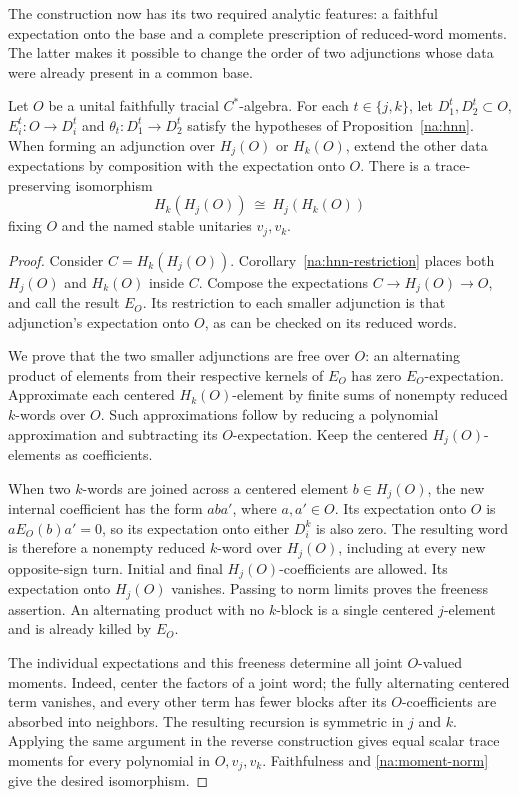 The construction now has its two required analytic features: a
faithful expectation onto the base and a complete prescription of
reduced-word moments.  The latter makes it possible to change the
order of two adjunctions whose data were already present in a common
base.

\begin{proposition}\label{na:reorder}
Let $O$ be a unital faithfully tracial $C^*$-algebra.  For each
$t\in\{j,k\}$, let $D_1^t,D_2^t\subset O$, $E_i^t:O\to D_i^t$
and $\theta_t:D_1^t\to D_2^t$ satisfy the hypotheses of
Proposition~\ref{na:hnn}.  When forming an adjunction over $H_j(O)$
or $H_k(O)$, extend the other data expectations by composition with
the expectation onto $O$.  There is a trace-preserving isomorphism
\begin{equation}\label{na:reorder-equation}
 H_k(H_j(O))\ \cong\ H_j(H_k(O))
\end{equation}
fixing $O$ and the named stable unitaries $v_j,v_k$.
\end{proposition}

\begin{proof}
Consider $C=H_k(H_j(O))$.  Corollary~\ref{na:hnn-restriction} places
both $H_j(O)$ and $H_k(O)$ inside $C$.  Compose the expectations
$C\to H_j(O)\to O$, and call the result $E_O$.  Its restriction to
each smaller adjunction is that adjunction's expectation onto $O$,
as can be checked on its reduced words.

We prove that the two smaller adjunctions are free over $O$: an
alternating product of elements from their respective kernels of
$E_O$ has zero $E_O$-expectation.  Approximate each centered
$H_k(O)$-element by finite sums of nonempty reduced $k$-words over
$O$.  Such approximations follow by reducing a polynomial
approximation and subtracting its $O$-expectation.  Keep the centered
$H_j(O)$-elements as coefficients.

When two $k$-words are joined across a centered element
$b\in H_j(O)$, the new internal coefficient has the form $aba'$,
where $a,a'\in O$.  Its expectation onto $O$ is
$aE_O(b)a'=0$, so its expectation onto either $D_i^k$ is also zero.
The resulting word is therefore a nonempty reduced $k$-word over
$H_j(O)$, including at every new opposite-sign turn.  Initial and
final $H_j(O)$-coefficients are allowed.  Its expectation onto
$H_j(O)$ vanishes.  Passing to norm limits proves the freeness
assertion.  An alternating product with no $k$-block is a single
centered $j$-element and is already killed by $E_O$.

The individual expectations and this freeness determine all joint
$O$-valued moments.  Indeed, center the factors of a joint word; the
fully alternating centered term vanishes, and every other term has
fewer blocks after its $O$-coefficients are absorbed into neighbors.
The resulting recursion is symmetric in $j$ and $k$.  Applying the
same argument in the reverse construction gives equal scalar trace
moments for every polynomial in $O,v_j,v_k$.  Faithfulness and
\eqref{na:moment-norm} give the desired isomorphism.
\end{proof}


